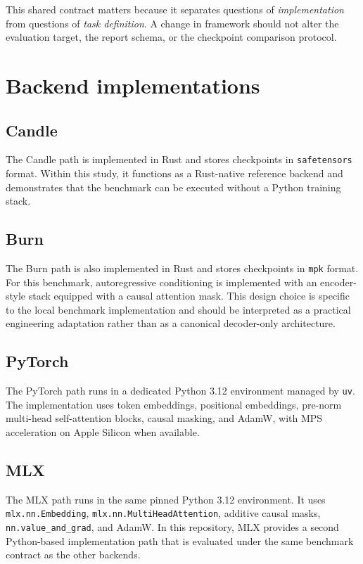 \documentclass[11pt]{article}
\begin{document}
This shared contract matters because it separates questions of \emph{implementation} from questions of \emph{task definition}. A change in framework should not alter the evaluation target, the report schema, or the checkpoint comparison protocol.

\section{Backend implementations}

\subsection{Candle}

The Candle path is implemented in Rust and stores checkpoints in \texttt{safetensors} format. Within this study, it functions as a Rust-native reference backend and demonstrates that the benchmark can be executed without a Python training stack.

\subsection{Burn}

The Burn path is also implemented in Rust and stores checkpoints in \texttt{mpk} format. For this benchmark, autoregressive conditioning is implemented with an encoder-style stack equipped with a causal attention mask. This design choice is specific to the local benchmark implementation and should be interpreted as a practical engineering adaptation rather than as a canonical decoder-only architecture.

\subsection{PyTorch}

The PyTorch path runs in a dedicated Python 3.12 environment managed by \texttt{uv}. The implementation uses token embeddings, positional embeddings, pre-norm multi-head self-attention blocks, causal masking, and AdamW, with MPS acceleration on Apple Silicon when available.

\subsection{MLX}

The MLX path runs in the same pinned Python 3.12 environment. It uses \texttt{mlx.nn.Embedding}, \texttt{mlx.nn.MultiHeadAttention}, additive causal masks, \texttt{nn.value\_and\_grad}, and AdamW. In this repository, MLX provides a second Python-based implementation path that is evaluated under the same benchmark contract as the other backends.
\end{document}
